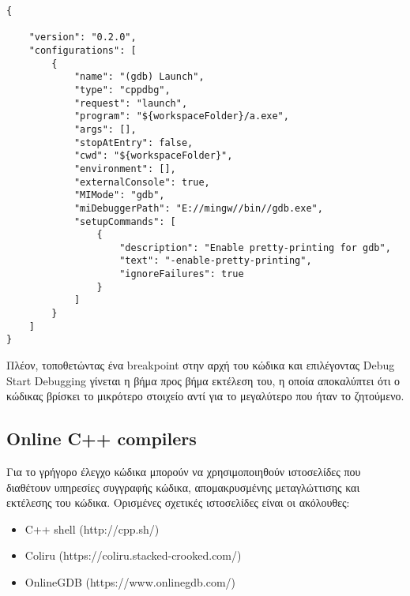 \begin{enumerate}
\begin{lstlisting}[style=DOS,caption=launch.json]
{

    "version": "0.2.0",
    "configurations": [
        {
            "name": "(gdb) Launch",
            "type": "cppdbg",
            "request": "launch",
            "program": "${workspaceFolder}/a.exe",
            "args": [],
            "stopAtEntry": false,
            "cwd": "${workspaceFolder}",
            "environment": [],
            "externalConsole": true,
            "MIMode": "gdb",
            "miDebuggerPath": "E://mingw//bin//gdb.exe",
            "setupCommands": [
                {
                    "description": "Enable pretty-printing for gdb",
                    "text": "-enable-pretty-printing",
                    "ignoreFailures": true
                }
            ]
        }
    ]
}
\end{lstlisting}

Πλέον, τοποθετώντας ένα breakpoint στην αρχή του κώδικα και επιλέγοντας Debug \textrightarrow Start Debugging γίνεται η βήμα προς βήμα εκτέλεση του, η οποία αποκαλύπτει ότι ο κώδικας βρίσκει το μικρότερο στοιχείο αντί για το μεγαλύτερο που ήταν το ζητούμενο. 

\end{enumerate}
%

\subsection*{Online C++ compilers}
Για το γρήγορο έλεγχο κώδικα μπορούν να χρησιμοποιηθούν ιστοσελίδες που διαθέτουν υπηρεσίες συγγραφής κώδικα, απομακρυσμένης μεταγλώττισης και εκτέλεσης του κώδικα. Ορισμένες σχετικές ιστοσελίδες είναι οι ακόλουθες:
\begin{itemize}
\item C++ shell (http://cpp.sh/)
\item Coliru (https://coliru.stacked-crooked.com/)
\item OnlineGDB (https://www.onlinegdb.com/)
\end{itemize}  


